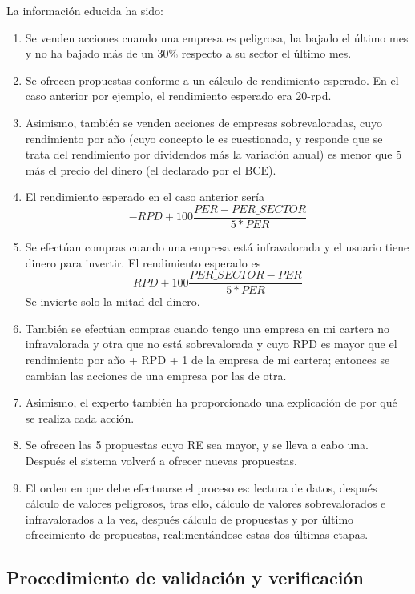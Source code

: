 \documentclass[a4paper,11pt]{article}
\begin{document}
La información educida ha sido:

\begin{enumerate}[$\rightarrow$]
 \item Se venden acciones cuando una empresa es peligrosa, ha bajado el último mes y no ha bajado más de un 30\% respecto 
 a su sector el último mes.
 \item Se ofrecen propuestas conforme a un cálculo de rendimiento esperado. En el caso anterior por ejemplo, el rendimiento
 esperado era 20-rpd.
 \item Asimismo, también se venden acciones de empresas sobrevaloradas, cuyo rendimiento por año (cuyo concepto
 le es cuestionado, y responde que se trata del rendimiento por dividendos más la
 variación anual) es menor que 5 más el precio del dinero (el declarado por el BCE).
 \item El rendimiento esperado en el caso anterior sería $$-RPD + 100 \frac{PER - PER\_SECTOR}{5*PER}$$
 \item Se efectúan compras cuando una empresa está infravalorada y el usuario tiene dinero para invertir. El rendimiento esperado
 es $$RPD + 100 \frac{PER\_SECTOR - PER}{5*PER}$$ Se invierte solo la mitad del dinero.
 \item También se efectúan compras cuando tengo una empresa en mi cartera no infravalorada y otra que no está sobrevalorada
 y cuyo RPD es mayor que el rendimiento por año + RPD + 1 de la empresa de mi cartera; entonces se cambian las acciones de una
 empresa por las de otra.
 \item Asimismo, el experto también ha proporcionado una explicación de por qué se realiza cada acción.
 \item Se ofrecen las 5 propuestas cuyo RE sea mayor, y se lleva a cabo una. Después el sistema volverá a ofrecer nuevas propuestas.
 \item El orden en que debe efectuarse el proceso es: lectura de datos, después cálculo de valores peligrosos, tras ello, cálculo de valores sobrevalorados
 e infravalorados a la vez, después cálculo de propuestas y por último ofrecimiento de propuestas, realimentándose estas dos
 últimas etapas.
\end{enumerate}


\subsection{Procedimiento de validación y verificación}
\end{document}

